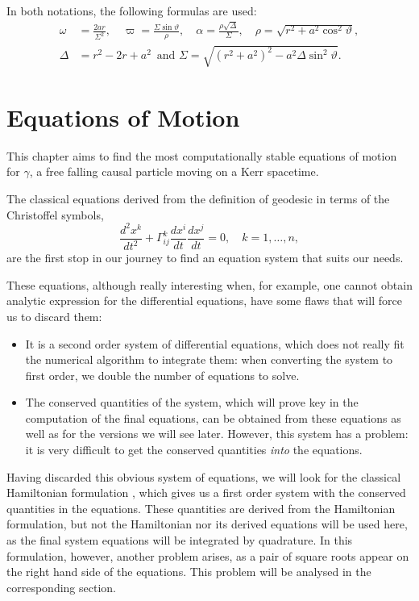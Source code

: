 In both notations, the following formulas are used:
\begin{align}
\omega &= \frac{2ar}{\Sigma^2},  \quad \varpi = \frac{\Sigma\sin\vartheta}{\rho}, \quad \alpha = \frac{\rho\sqrt{\Delta}}{\Sigma}, \quad \rho = \sqrt{r^2 + a^2\cos^2\vartheta},\nonumber\\
\Delta &= r^2 - 2r + a^2 \, \textrm{ and } \Sigma = \sqrt{(r^2+a^2)^2 - a^2\Delta\sin^2\vartheta}.
\label{eq:termdef}
\end{align}











\section{Equations of Motion}
\label{chapter:equations}

This chapter aims to find the most computationally stable equations of motion for $\gamma$, a free falling causal particle moving on a Kerr spacetime.

The classical equations derived from the definition of geodesic in terms of the Christoffel symbols,
\[
\frac{d^2x^k}{dt^2} + \Gamma^k_{ij} \frac{d x^i}{dt} \frac{d x^j}{dt} = 0, \quad k = 1, \dots, n,
\]
are the first stop in our journey to find an equation system that suits our needs.

These equations, although really interesting when, for example, one cannot obtain analytic expression for the differential equations, have some flaws that will force us to discard them:
\begin{itemize}
	\item It is a second order system of differential equations, which does not really fit the numerical algorithm to integrate them: when converting the system to first order, we double the number of equations to solve.
	\item The conserved quantities of the system, which will prove key in the computation of the final equations, can be obtained from these equations as well as for the versions we will see later. However, this system has a problem: it is very difficult to get the conserved quantities \emph{into} the equations.
\end{itemize}

Having discarded this obvious system of equations, we will look for the classical Hamiltonian formulation \cite[Sec. 33.5]{thorne73}, which gives us a first order system with the conserved quantities in the equations. These quantities are derived from the Hamiltonian formulation, but not the Hamiltonian nor its derived equations will be used here, as the final system equations will be integrated by quadrature. In this formulation, however, another problem arises, as a pair of square roots appear on the right hand side of the equations. This problem will be analysed in the corresponding section.

